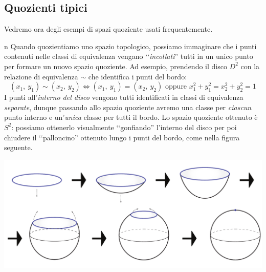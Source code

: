 \subsection{Quozienti tipici}
Vedremo ora degli esempi di spazi quoziente usati frequentemente.
\begin{intuitively}{n}
	Quando quozientiamo uno spazio topologico, possiamo immaginare che i punti contenuti nelle classi di equivalenza vengano ‘‘\textit{incollati}'' tutti in un unico punto per formare un nuovo spazio quoziente. Ad esempio, prendendo il disco $D^2$ con la relazione di equivalenza $\sim$ che identifica i punti del bordo:
	\begin{equation*}
		(x_1,\ y_1) \sim (x_2,\ y_2)\iff (x_1,\ y_1)=(x_2,\ y_2) \text{ oppure } x_1^2 +y_1^2= x_2^2 +y_2^2=1
	\end{equation*}
	I punti all'\textit{interno del disco} vengono tutti identificati in classi di equivalenza \textit{separate}, dunque passando allo spazio quoziente avremo una classe per \textit{ciascun} punto interno e un'\textit{unica} classe per tutti il bordo. Lo spazio quoziente ottenuto è $S^2$: possiamo ottenerlo visualmente ‘‘gonfiando'' l'interno del disco per poi chiudere il ‘‘palloncino'' ottenuto lungo i punti del bordo, come nella figura seguente.
	\begin{center}
		\includegraphics[trim=0cm 0cm 0cm 0cm,clip,scale=0.4]{images/disctosphere.pdf}
	\end{center}
\end{intuitively}
